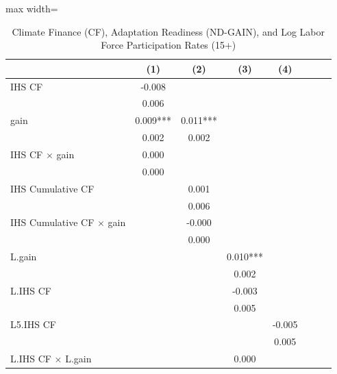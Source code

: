 \begin{table}[htbp]\centering \caption{Climate Finance (CF), Adaptation Readiness (ND-GAIN), and Log Labor Force Participation Rates (15+)} \begin{adjustbox}{max width=\textwidth} \begin{tabular}{l*{7}{c}} \toprule
                    &\multicolumn{1}{c}{(1)}   &\multicolumn{1}{c}{(2)}   &\multicolumn{1}{c}{(3)}   &\multicolumn{1}{c}{(4)}   \\
\midrule
IHS CF              &      -0.008   &               &               &               \\
                    &       0.006   &               &               &               \\
gain                &       0.009***&       0.011***&               &               \\
                    &       0.002   &       0.002   &               &               \\
IHS CF $\times$ gain&       0.000   &               &               &               \\
                    &       0.000   &               &               &               \\
IHS Cumulative CF   &               &       0.001   &               &               \\
                    &               &       0.006   &               &               \\
IHS Cumulative CF $\times$ gain&               &      -0.000   &               &               \\
                    &               &       0.000   &               &               \\
L.gain              &               &               &       0.010***&               \\
                    &               &               &       0.002   &               \\
L.IHS CF            &               &               &      -0.003   &               \\
                    &               &               &       0.005   &               \\
L5.IHS CF           &               &               &               &      -0.005   \\
                    &               &               &               &       0.005   \\
L.IHS CF $\times$ L.gain&               &               &       0.000   &               \\

\end{tabular}
\end{adjustbox}
\end{table}
